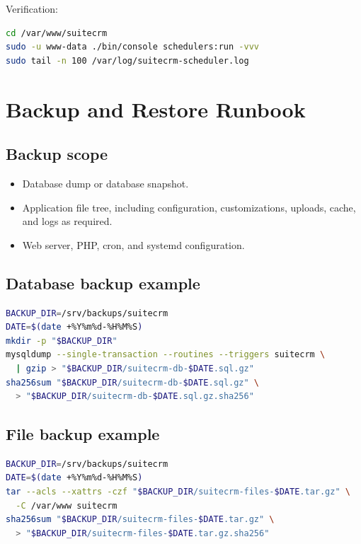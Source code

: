 \documentclass[11pt]{article}
\begin{document}
Verification:
\begin{lstlisting}[language=bash]
cd /var/www/suitecrm
sudo -u www-data ./bin/console schedulers:run -vvv
sudo tail -n 100 /var/log/suitecrm-scheduler.log
\end{lstlisting}

\section{Backup and Restore Runbook}
\subsection{Backup scope}
\begin{itemize}
  \item Database dump or database snapshot.
  \item Application file tree, including configuration, customizations, uploads, cache, and logs as required.
  \item Web server, PHP, cron, and systemd configuration.
\end{itemize}

\subsection{Database backup example}
\begin{lstlisting}[language=bash]
BACKUP_DIR=/srv/backups/suitecrm
DATE=$(date +%Y%m%d-%H%M%S)
mkdir -p "$BACKUP_DIR"
mysqldump --single-transaction --routines --triggers suitecrm \
  | gzip > "$BACKUP_DIR/suitecrm-db-$DATE.sql.gz"
sha256sum "$BACKUP_DIR/suitecrm-db-$DATE.sql.gz" \
  > "$BACKUP_DIR/suitecrm-db-$DATE.sql.gz.sha256"
\end{lstlisting}

\subsection{File backup example}
\begin{lstlisting}[language=bash]
BACKUP_DIR=/srv/backups/suitecrm
DATE=$(date +%Y%m%d-%H%M%S)
tar --acls --xattrs -czf "$BACKUP_DIR/suitecrm-files-$DATE.tar.gz" \
  -C /var/www suitecrm
sha256sum "$BACKUP_DIR/suitecrm-files-$DATE.tar.gz" \
  > "$BACKUP_DIR/suitecrm-files-$DATE.tar.gz.sha256"
\end{lstlisting}
\end{document}
